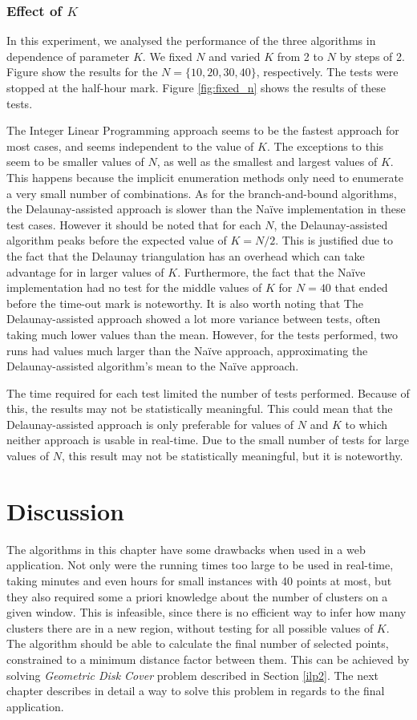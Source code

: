 \subsubsection*{Effect of $K$}
In this experiment, we analysed the performance of the three algorithms in dependence of parameter $K$. We fixed $N$ and varied $K$ from 2 to $N$ by steps of 2. Figure \cite{fig:fixed_n} show the results for the $N=\{10,20,30,40\}$, respectively. The tests were stopped at the half-hour mark. Figure \ref{fig:fixed_n} shows the results of these tests.

\noindent
The Integer Linear Programming approach seems to be the fastest approach for most cases, and seems independent to the value of $K$. The exceptions to this seem to be smaller values of $N$, as well as the smallest and largest values of $K$. This happens because the implicit enumeration methods only need to enumerate a very small number of combinations.
As for the branch-and-bound algorithms, the Delaunay-assisted approach is slower than the Naïve implementation in these test cases. However it should be noted that for each $N$, the Delaunay-assisted algorithm peaks before the expected value of $K=N/2$. This is justified due to the fact that the Delaunay triangulation has an overhead which can take advantage for in larger values of $K$.
Furthermore, the fact that the Naïve implementation had no test for the middle values of $K$ for $N=40$ that ended before the time-out mark is noteworthy.
It is also worth noting that The Delaunay-assisted approach showed a lot more variance between tests, often taking much lower values than the mean. However, for the tests performed, two runs had values much larger than the Naïve approach, approximating the Delaunay-assisted algorithm's mean to the Naïve approach.

The time required for each test limited the number of tests performed. Because of this, the results may not be statistically meaningful. 
This could mean that the Delaunay-assisted approach is only preferable for values of $N$ and $K$ to which neither approach is usable in real-time. Due to the small number of tests for large values of $N$, this result may not be statistically meaningful, but it is noteworthy.

\section{Discussion}
The algorithms in this chapter have some drawbacks when used in a web application. Not only were the running times too large to be used in real-time, taking minutes and even hours for small instances with 40 points at most, but they also required some a priori knowledge about the number of clusters on a given window. This is infeasible, since there is no efficient way to infer how many clusters there are in a new region, without testing for all possible values of $K$. The algorithm should be able to calculate the final number of selected points, constrained to a minimum distance factor between them. This can be achieved by solving \emph{Geometric Disk Cover} problem described in Section \ref{ilp2}. The next chapter describes in detail a way to solve this problem in regards to the final application.
